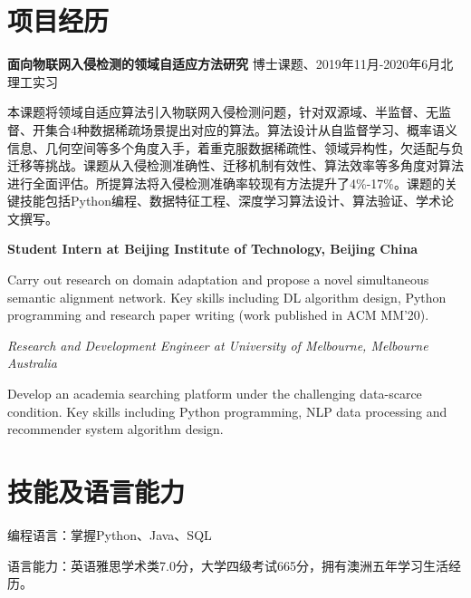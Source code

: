 \documentclass[letterpaper,11pt]{article}
\begin{document}
\vspace{1pt}

\section{项目经历}

\textbf{面向物联网入侵检测的领域自适应方法研究} \hfill 博士课题、2019年11月-2020年6月北理工实习

\vspace{1pt}

本课题将领域自适应算法引入物联网入侵检测问题，针对双源域、半监督、无监督、开集合4种数据稀疏场景提出对应的算法。算法设计从自监督学习、概率语义信息、几何空间等多个角度入手，着重克服数据稀疏性、领域异构性，欠适配与负迁移等挑战。课题从入侵检测准确性、迁移机制有效性、算法效率等多角度对算法进行全面评估。所提算法将入侵检测准确率较现有方法提升了4\%-17\%。课题的关键技能包括Python编程、数据特征工程、深度学习算法设计、算法验证、学术论文撰写。

\vspace{9pt}

\textbf{Student Intern at Beijing Institute of Technology, Beijing China}

Carry out research on domain adaptation and propose a novel simultaneous semantic alignment network. Key skills including DL algorithm design, Python programming and research paper writing (work published in ACM MM'20). 

\vspace{9pt}

\textit{Research and Development Engineer at University of Melbourne, Melbourne Australia}

Develop an academia searching platform under the challenging data-scarce condition. Key skills including Python programming, NLP data processing and recommender system algorithm design. 

\vspace{1pt}

\section{技能及语言能力}

编程语言：掌握Python、Java、SQL

语言能力：英语雅思学术类7.0分，大学四级考试665分，拥有澳洲五年学习生活经历。
\end{document}
